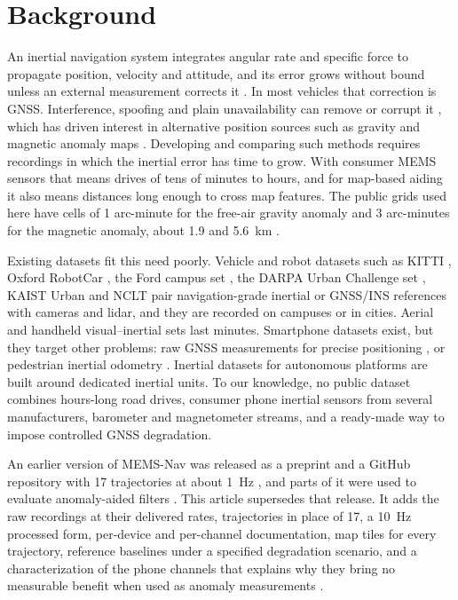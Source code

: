 \section{Background}
\label{sec:background}

An inertial navigation system integrates angular rate and specific force to propagate position, velocity and attitude, and its error grows without bound unless an external measurement corrects it \citep{groves}. In most vehicles that correction is GNSS. Interference, spoofing and plain unavailability can remove or corrupt it \citep{9112619}, which has driven interest in alternative position sources such as gravity and magnetic anomaly maps \citep{canciani2016absolute,canciani2017airborne,gravnav}. Developing and comparing such methods requires recordings in which the inertial error has time to grow. With consumer MEMS sensors that means drives of tens of minutes to hours, and for map-based aiding it also means distances long enough to cross map features. The public grids used here have cells of 1 arc-minute for the free-air gravity anomaly and 3 arc-minutes for the magnetic anomaly, about 1.9 and 5.6~km \citep{SANDWELL20211059,wdmam}.

Existing datasets fit this need poorly. Vehicle and robot datasets such as KITTI \citep{kitti}, Oxford RobotCar \citep{oxford-robotcar}, the Ford campus set \citep{ford-campus}, the DARPA Urban Challenge set \citep{mit-darpa}, KAIST Urban \citep{kaist-urban} and NCLT \citep{nclt} pair navigation-grade inertial or GNSS/INS references with cameras and lidar, and they are recorded on campuses or in cities. Aerial and handheld visual--inertial sets \citep{burri2016euroc,tum-vi,uzh-fpv,nguyen2022ntu,newer-college} last minutes. Smartphone datasets exist, but they target other problems: raw GNSS measurements for precise positioning \citep{fu2020android}, or pedestrian inertial odometry \citep{herath2020ronin}. Inertial datasets for autonomous platforms \citep{ansfl,yampolsky2024multiple} are built around dedicated inertial units. To our knowledge, no public dataset combines hours-long road drives, consumer phone inertial sensors from several manufacturers, barometer and magnetometer streams, and a ready-made way to impose controlled GNSS degradation.

An earlier version of MEMS-Nav was released as a preprint and a GitHub repository with 17 trajectories at about 1~Hz \citep{memsnav-preprint}, and parts of it were used to evaluate anomaly-aided filters \citep{anom-ukf,anom-pf}. This article supersedes that release. It adds the raw recordings at their delivered rates, \numTrajectories{} trajectories in place of 17, a 10~Hz processed form, per-device and per-channel documentation, map tiles for every trajectory, reference baselines under a specified degradation scenario, and a characterization of the phone channels that explains why they bring no measurable benefit when used as anomaly measurements \citep{brodovsky2026dissertation}.
